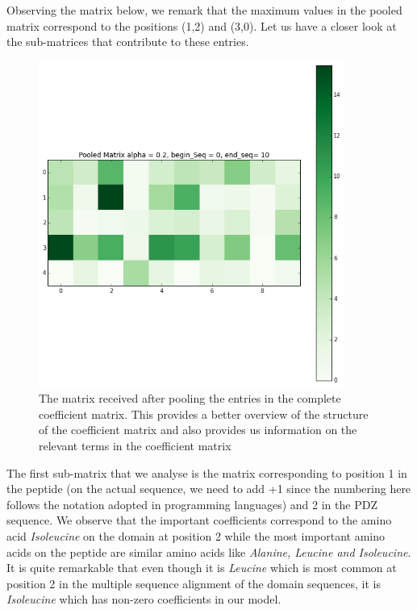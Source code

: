 \documentclass[a4paper, 12pt]{article}
\begin{document}
\begin{enumerate}
Observing the matrix below, we remark that the maximum values in the pooled matrix correspond to the positions (1,2) and (3,0). Let us have a closer look at the sub-matrices that contribute to these entries. 

\begin{figure}[!h]
\centering 
\label{pooled_matrix}
\includegraphics[width=10cm]{Images/pooled_matrix_seq_10.png}
\caption{The matrix received after pooling the entries in the complete coefficient matrix. This provides a better overview of the structure of the coefficient matrix and also provides us information on the relevant terms in the coefficient matrix}
\end{figure} 

The first sub-matrix that we analyse is the matrix corresponding to position 1 in the peptide (on the actual sequence, we need to add +1 since the numbering here follows the notation adopted in programming languages) and 2 in the PDZ sequence. We observe that the important coefficients correspond to the amino acid \emph{Isoleucine} on the domain at position 2 while the most important amino acids on the peptide are similar amino acids like \emph{Alanine, Leucine and Isoleucine}. It is quite remarkable that even though it is \emph{Leucine} which is most common at position 2 in the multiple sequence alignment of the domain sequences, it is \emph{Isoleucine} which has non-zero coefficients in our model. 


\end{enumerate}
\end{document}
